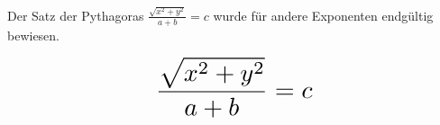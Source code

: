 \documentclass{article}
\begin{document}
\noindent Der Satz der Pythagoras \( \frac{\sqrt{x^2 + y^2}}{a + b} = c \) wurde für andere Exponenten endgültig bewiesen.

\[ \scalebox{2}{$\displaystyle 
\frac{\sqrt{x^2 + y^2}}{a + b} = c
$} \]
\end{document}
